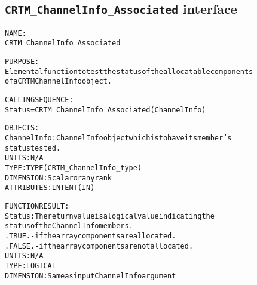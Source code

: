 \subsection{\texttt{CRTM\_ChannelInfo\_Associated} interface}
  \label{sec:CRTM_ChannelInfo_Associated_interface}
  \begin{alltt}
 
  NAME:
        CRTM_ChannelInfo_Associated
 
  PURPOSE:
        Elemental function to test the status of the allocatable components
        of a CRTM ChannelInfo object.
 
  CALLING SEQUENCE:
        Status = CRTM_ChannelInfo_Associated( ChannelInfo )
 
  OBJECTS:
        ChannelInfo:   ChannelInfo object which is to have its member's
                       status tested.
                       UNITS:      N/A
                       TYPE:       TYPE(CRTM_ChannelInfo_type)
                       DIMENSION:  Scalar or any rank
                       ATTRIBUTES: INTENT(IN)
 
  FUNCTION RESULT:
        Status:        The return value is a logical value indicating the
                       status of the ChannelInfo members.
                         .TRUE.  - if the array components are allocated.
                         .FALSE. - if the array components are not allocated.
                       UNITS:      N/A
                       TYPE:       LOGICAL
                       DIMENSION:  Same as input ChannelInfo argument
 
  \end{alltt}
